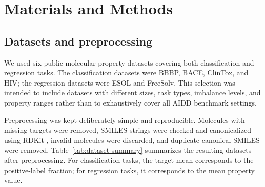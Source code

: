 \section{Materials and Methods}

\subsection{Datasets and preprocessing}

We used six public molecular property datasets covering both classification and regression tasks. The classification datasets were BBBP, BACE, ClinTox, and HIV; the regression datasets were ESOL and FreeSolv. This selection was intended to include datasets with different sizes, task types, imbalance levels, and property ranges rather than to exhaustively cover all AIDD benchmark settings.

Preprocessing was kept deliberately simple and reproducible. Molecules with missing targets were removed, SMILES strings were checked and canonicalized using RDKit \citep{rdkit}, invalid molecules were discarded, and duplicate canonical SMILES were removed. Table~\ref{tab:dataset-summary} summarizes the resulting datasets after preprocessing. For classification tasks, the target mean corresponds to the positive-label fraction; for regression tasks, it corresponds to the mean property value.

\begin{table}[H]
\centering
\caption{Dataset summary after preprocessing. For classification datasets, target mean corresponds to the positive-label fraction.}
\label{tab:dataset-summary}
\end{table}

